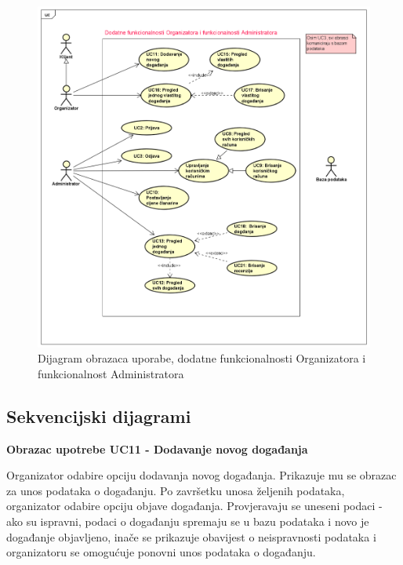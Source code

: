 				\begin{figure}[H]
					\includegraphics[scale=0.5]{dijagrami/uc2.PNG}
					\centering
					\caption{Dijagram obrazaca uporabe, dodatne funkcionalnosti Organizatora i funkcionalnost Administratora}
					\label{fig:promjene}
				\end{figure}
				
				\newpage
				
			\subsection{Sekvencijski dijagrami}
			
				\noindent \textbf{Obrazac upotrebe UC11 - Dodavanje novog događanja}
				
				\noindent Organizator odabire opciju dodavanja novog događanja. Prikazuje mu se obrazac za unos podataka o događanju. Po završetku unosa željenih podataka, organizator odabire opciju objave događanja. Provjeravaju se uneseni podaci - ako su ispravni, podaci o događanju spremaju se u bazu podataka i novo je događanje objavljeno, inače se prikazuje obavijest o neispravnosti podataka i organizatoru se omogućuje ponovni unos podataka o događanju. 
				
